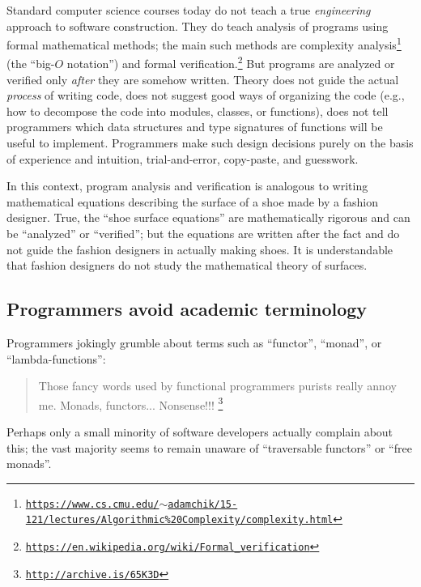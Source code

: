 Standard computer science courses today do not teach a true \emph{engineering}
approach to software construction. They do teach analysis of programs
using formal mathematical methods; the main such methods are complexity
analysis\footnote{\texttt{\href{https://www.cs.cmu.edu/~adamchik/15-121/lectures/Algorithmic\%20Complexity/complexity.html}{https://www.cs.cmu.edu/$\sim$adamchik/15-121/lectures/Algorithmic\%20Complexity/complexity.html}}}
(the \textsf{``}big-$O$ notation\textsf{''}) and formal verification.\footnote{\texttt{\href{https://en.wikipedia.org/wiki/Formal_verification}{https://en.wikipedia.org/wiki/Formal\_verification}}}
But programs are analyzed or verified only \emph{after} they are somehow
written. Theory does not guide the actual \emph{process} of writing
code, does not suggest good ways of organizing the code (e.g., how
to decompose the code into modules, classes, or functions), does not
tell programmers which data structures and type signatures of functions
will be useful to implement. Programmers make such design decisions
purely on the basis of experience and intuition, trial-and-error,
copy-paste, and guesswork. 

In this context, program analysis and verification is analogous to
writing mathematical equations describing the surface of a shoe made
by a fashion designer. True, the \textsf{``}shoe surface equations\textsf{''} are
mathematically rigorous and can be \textsf{``}analyzed\textsf{''} or \textsf{``}verified\textsf{''};
but the equations are written after the fact and do not guide the
fashion designers in actually making shoes. It is understandable that
fashion designers do not study the mathematical theory of surfaces.

\subsection{Programmers avoid academic terminology }

Programmers jokingly grumble about terms such as \textsf{``}functor\textsf{''}, \textsf{``}monad\textsf{''},
or \textsf{``}lambda-functions\textsf{''}:
\begin{quote}
{\small{}Those fancy words used by functional programmers purists
really annoy me. Monads, functors... Nonsense!!! }\footnote{\texttt{\href{http://archive.is/65K3D}{http://archive.is/65K3D}}}
\end{quote}
Perhaps only a small minority of software developers actually complain
about this; the vast majority seems to remain unaware of \textsf{``}traversable
functors\textsf{''} or \textsf{``}free monads\textsf{''}.

